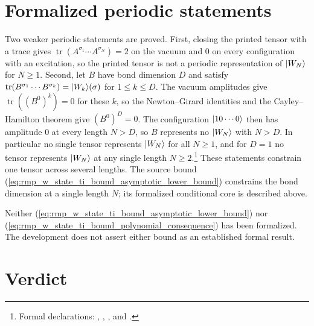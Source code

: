 \documentclass{article}
\begin{document}
\section{Formalized periodic statements}

Two weaker periodic statements are proved. First, closing the printed tensor
with a trace gives $\operatorname{tr}(A^{\sigma_1}\cdots A^{\sigma_N})=2$ on
the vacuum and $0$ on every configuration with an excitation, so the printed
tensor is not a periodic representation of $|W_N\rangle$ for $N\geq1$. Second,
let $B$ have bond dimension $D$ and satisfy
$\operatorname{tr}(B^{\sigma_1}\cdots B^{\sigma_k})=|W_k\rangle(\sigma)$ for
$1\leq k\leq D$. The vacuum amplitudes give
$\operatorname{tr}((B^0)^k)=0$ for these $k$, so the Newton--Girard identities
and the Cayley--Hamilton theorem give $(B^0)^D=0$. The configuration
$|10\cdots0\rangle$ then has amplitude $0$ at every length $N>D$, so $B$
represents no $|W_N\rangle$ with $N>D$. In particular no single tensor
represents $|W_N\rangle$ for all $N\geq1$, and for $D=1$ no tensor represents
$|W_N\rangle$ at any single length $N\geq2$.\footnote{Formal declarations:
    ,
    ,
    , and
    .}
These statements constrain one tensor across several lengths. The source bound
(\ref{eq:rmp_w_state_ti_bound_asymptotic_lower_bound}) constrains the bond
dimension at a single length $N$; its formalized conditional core is described
above.

Neither
(\ref{eq:rmp_w_state_ti_bound_asymptotic_lower_bound}) nor
(\ref{eq:rmp_w_state_ti_bound_polynomial_consequence}) has been formalized.
The development does not assert either bound as an established formal result.

\section{Verdict}
\end{document}
